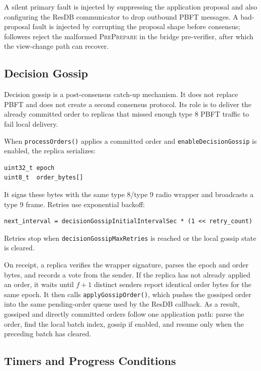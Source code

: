 \documentclass[fleqn,10pt]{olplainarticle}
\begin{document}
A silent primary fault is injected by suppressing the application proposal and also configuring the ResDB communicator to drop outbound PBFT messages. A bad-proposal fault is injected by corrupting the proposal shape before consensus; followers reject the malformed \textsc{PrePrepare} in the bridge pre-verifier, after which the view-change path can recover.

\subsection{Decision Gossip}
\label{subsec:decision-gossip}

Decision gossip is a post-consensus catch-up mechanism. It does not replace PBFT and does not create a second consensus protocol. Its role is to deliver the already committed order to replicas that missed enough type 8 PBFT traffic to fail local delivery.

When \texttt{processOrders()} applies a committed order and \texttt{enableDecisionGossip} is enabled, the replica serializes:

\begin{verbatim}
uint32_t epoch
uint8_t  order_bytes[]
\end{verbatim}

It signs these bytes with the same type 8/type 9 radio wrapper and broadcasts a type 9 frame. Retries use exponential backoff:

\begin{verbatim}
next_interval = decisionGossipInitialIntervalSec * (1 << retry_count)
\end{verbatim}

Retries stop when \texttt{decisionGossipMaxRetries} is reached or the local gossip state is cleared.

On receipt, a replica verifies the wrapper signature, parses the epoch and order bytes, and records a vote from the sender. If the replica has not already applied an order, it waits until $f+1$ distinct senders report identical order bytes for the same epoch. It then calls \texttt{applyGossipOrder()}, which pushes the gossiped order into the same pending-order queue used by the ResDB callback. As a result, gossiped and directly committed orders follow one application path: parse the order, find the local batch index, gossip if enabled, and resume only when the preceding batch has cleared.

\subsection{Timers and Progress Conditions}
\label{subsec:timers-progress}
\end{document}
